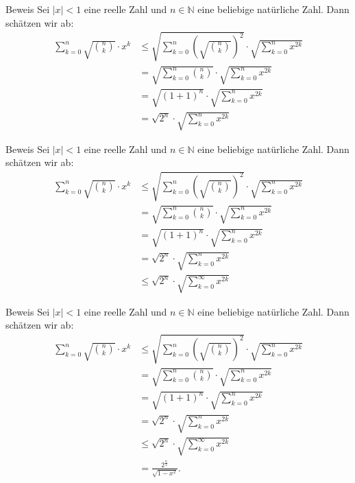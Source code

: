 \documentclass[10pt]{beamer}
\def\bN{\mathbb{N}}
\begin{document}
\begin{frame}{Beweis}
    Sei \( \left\vert x \right\vert < 1 \) eine reelle Zahl und \( n \in \bN \) eine beliebige natürliche Zahl. Dann schätzen wir ab:
    \begin{align*}
        \sum_{k = 0}^{n} \sqrt{\binom{n}{k}} \cdot x^{k}
        & \leq \sqrt{\sum_{k = 0}^{n} \left( \sqrt{\binom{n}{k}} \right)^{2}} \cdot \sqrt{\sum_{k = 0}^{n} x^{2k}} \\
        & = \sqrt{\sum_{k = 0}^{n} \binom{n}{k}} \cdot \sqrt{\sum_{k = 0}^{n} x^{2k}} \\
        & = \sqrt{\left( 1 + 1 \right)^{n}} \cdot \sqrt{\sum_{k = 0}^{n} x^{2k}} \\
        & = \sqrt{2^{n}} \cdot \sqrt{\sum_{k = 0}^{n} x^{2k}}
    \end{align*}
\end{frame}



\begin{frame}{Beweis}
    Sei \( \left\vert x \right\vert < 1 \) eine reelle Zahl und \( n \in \bN \) eine beliebige natürliche Zahl. Dann schätzen wir ab:
    \begin{align*}
        \sum_{k = 0}^{n} \sqrt{\binom{n}{k}} \cdot x^{k}
        & \leq \sqrt{\sum_{k = 0}^{n} \left( \sqrt{\binom{n}{k}} \right)^{2}} \cdot \sqrt{\sum_{k = 0}^{n} x^{2k}} \\
        & = \sqrt{\sum_{k = 0}^{n} \binom{n}{k}} \cdot \sqrt{\sum_{k = 0}^{n} x^{2k}} \\
        & = \sqrt{\left( 1 + 1 \right)^{n}} \cdot \sqrt{\sum_{k = 0}^{n} x^{2k}} \\
        & = \sqrt{2^{n}} \cdot \sqrt{\sum_{k = 0}^{n} x^{2k}} \\
        & \leq \sqrt{2^{n}} \cdot \sqrt{\sum_{k = 0}^{\infty} x^{2k}}
    \end{align*}
\end{frame}



\begin{frame}{Beweis}
    Sei \( \left\vert x \right\vert < 1 \) eine reelle Zahl und \( n \in \bN \) eine beliebige natürliche Zahl. Dann schätzen wir ab:
    {\small
    \begin{align*}
        \sum_{k = 0}^{n} \sqrt{\binom{n}{k}} \cdot x^{k}
        & \leq \sqrt{\sum_{k = 0}^{n} \left( \sqrt{\binom{n}{k}} \right)^{2}} \cdot \sqrt{\sum_{k = 0}^{n} x^{2k}} \\
        & = \sqrt{\sum_{k = 0}^{n} \binom{n}{k}} \cdot \sqrt{\sum_{k = 0}^{n} x^{2k}} \\
        & = \sqrt{\left( 1 + 1 \right)^{n}} \cdot \sqrt{\sum_{k = 0}^{n} x^{2k}} \\
        & = \sqrt{2^{n}} \cdot \sqrt{\sum_{k = 0}^{n} x^{2k}} \\
        & \leq \sqrt{2^{n}} \cdot \sqrt{\sum_{k = 0}^{\infty} x^{2k}} \\
        & = \frac{2^{\frac{n}{2}}}{\sqrt{1 - x^{2}}}.
    \end{align*}
    }
\end{frame}
\end{document}
